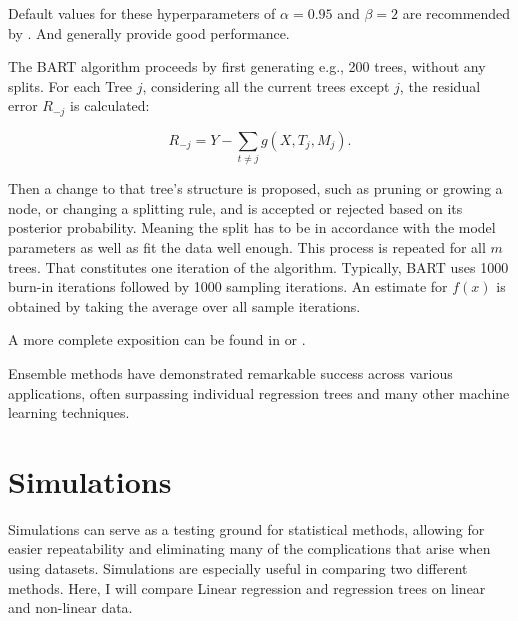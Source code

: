 \documentclass[12pt]{article}
\begin{document}
Default values for these hyperparameters of $\alpha = 0.95$ and $\beta = 2$ are recommended by \citep{chipman2010}. And generally provide good performance.

The BART algorithm proceeds by first generating e.g., 200 trees, without any splits. For each Tree $j$, considering all the current trees except $j$, the residual error $R_{-j}$ is calculated:

\begin{equation}
    R_{-j} = Y - \sum_{t\not=j} g(X,T_j,M_j).
\end{equation}

Then a change to that tree's structure is proposed, such as pruning or growing a node, or changing a splitting rule, and is accepted or rejected based on its posterior probability. Meaning the split has to be in accordance with the model parameters as well as fit the data well enough. This process is repeated for all $m$ trees. That constitutes one iteration of the algorithm. Typically, BART uses 1000 burn-in iterations followed by 1000 sampling iterations. An estimate for $f(x)$ is obtained by taking the average over all sample iterations.

A more complete exposition can be found in \citep{tan2019} or \citep{chipman2010}.

Ensemble methods have demonstrated remarkable success across various applications, often surpassing individual regression trees and many other machine learning techniques.


\section{Simulations}

Simulations can serve as a testing ground for statistical methods, allowing for easier repeatability and eliminating many of the complications that arise when using datasets. Simulations are especially useful in comparing two different methods. Here, I will compare Linear regression and regression trees on linear and non-linear data.
\end{document}
